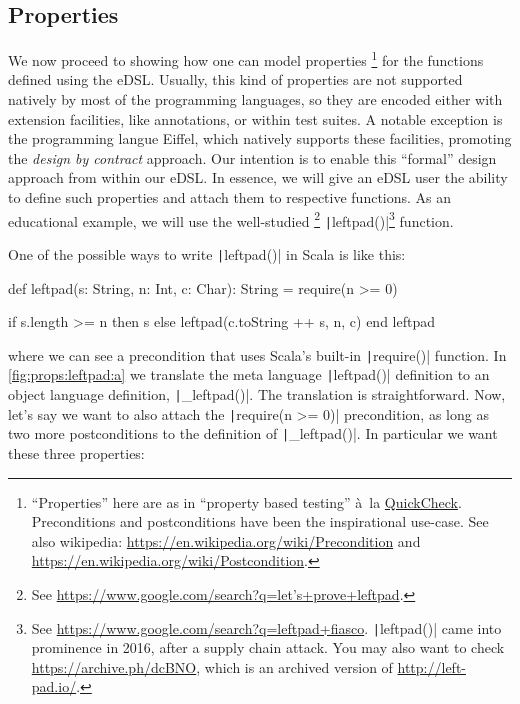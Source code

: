 \documentclass[11pt]{article}
\renewcommand{\vref}[1]{\autoref{#1} \vpageref{#1}}{}
\newcommand{\ScalaI}[1]{\texttt|#1|}
\newcommand{\TextI}[1]{\texttt|#1|}
\begin{document}
\subsection{Properties}
\label{sec:properties}
We now proceed to showing how one can model properties%
\footnote{``Properties'' here are as in ``property based testing'' à~la \href{https://en.wikipedia.org/wiki/QuickCheck}{QuickCheck}. Preconditions and postconditions have been the inspirational use-case. See also wikipedia: \href{https://en.wikipedia.org/wiki/Precondition}{https://en.wikipedia.org/wiki/Precondition} and \href{https://en.wikipedia.org/wiki/Postcondition}{https://en.wikipedia.org/wiki/Postcondition}.} for the functions defined using the eDSL. Usually, this kind of properties are not supported natively by most of the programming languages, so they are encoded either with extension facilities, like annotations, or within test suites. A notable exception is the programming langue Eiffel, which natively supports these facilities, promoting the \textit{design by contract} approach. Our intention is to enable this ``formal'' design approach from within our eDSL. In essence, we will give an eDSL user the ability to define such properties and attach them to respective functions. As an educational example, we will use the well-studied%
\footnote{See \href{https://www.google.com/search?q=let's+prove+leftpad}{https://www.google.com/search?q=let's+prove+leftpad}.} \TextI{leftpad()}\footnote{See \href{https://www.google.com/search?q=leftpad+fiasco}{https://www.google.com/search?q=leftpad+fiasco}. \TextI{leftpad()} came into prominence in 2016, after a supply chain attack. You may also want to check \href{https://archive.ph/dcBNO}{https://archive.ph/dcBNO}, which is an archived version of \href{http://left-pad.io/}{http://left-pad.io/}.} function.

One of the possible ways to write \ScalaI{leftpad()} in Scala is like this:

\begin{ScalaBlockSimple}
def leftpad(s: String, n: Int, c: Char): String =
  require(n >= 0)

  if s.length >= n then s else leftpad(c.toString ++ s, n, c)
end leftpad
\end{ScalaBlockSimple}

\noindent where we can see a precondition that uses Scala's built-in \ScalaI{require()} function. In \vref{fig:props:leftpad:a} we translate the meta language \ScalaI{leftpad()} definition to an object language definition, \ScalaI{_leftpad()}. The translation is straightforward.  Now, let's say we want to also attach the \ScalaI{require(n >= 0)} precondition, as long as two more postconditions to the definition of \ScalaI{_leftpad()}. In particular we want these three properties:
\end{document}
